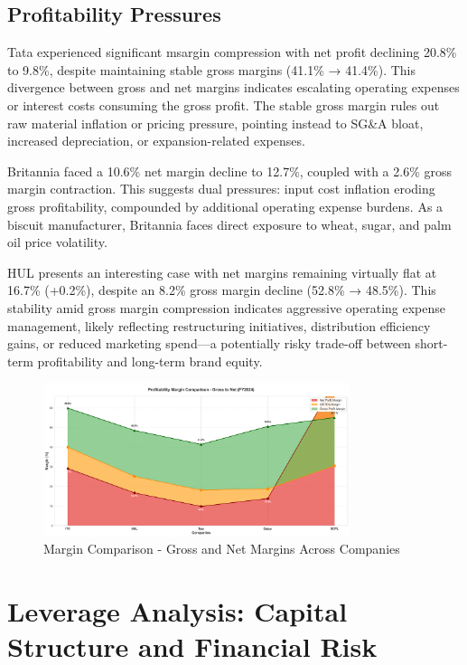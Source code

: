 \documentclass[12pt, a4paper]{report}
\begin{document}
\subsection{Profitability Pressures}

Tata experienced significant msargin compression with net profit declining 20.8\% to 9.8\%, despite maintaining stable gross margins (41.1\% → 41.4\%). This divergence between gross and net margins indicates escalating operating expenses or interest costs consuming the gross profit. The stable gross margin rules out raw material inflation or pricing pressure, pointing instead to SG\&A bloat, increased depreciation, or expansion-related expenses.

Britannia faced a 10.6\% net margin decline to 12.7\%, coupled with a 2.6\% gross margin contraction. This suggests dual pressures: input cost inflation eroding gross profitability, compounded by additional operating expense burdens. As a biscuit manufacturer, Britannia faces direct exposure to wheat, sugar, and palm oil price volatility.

HUL presents an interesting case with net margins remaining virtually flat at 16.7\% (+0.2\%), despite an 8.2\% gross margin decline (52.8\% → 48.5\%). This stability amid gross margin compression indicates aggressive operating expense management, likely reflecting restructuring initiatives, distribution efficiency gains, or reduced marketing spend—a potentially risky trade-off between short-term profitability and long-term brand equity.

\begin{figure}[H]
    \centering
    \includegraphics[width=0.8\textwidth]{assets/imperative_analysis/margin_comparison_area.png}
    \caption{Margin Comparison - Gross and Net Margins Across Companies}
\end{figure}

\vspace{0.3cm}

\section{Leverage Analysis: Capital Structure and Financial Risk}
\end{document}
